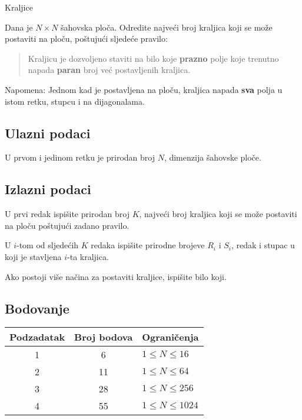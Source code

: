 \begin{statement}[
  problempoints=100,
  timelimit=1 sekunda,
  memorylimit=512 MiB,
]{Kraljice}

Dana je $N \times N$ šahovska ploča. Odredite najveći broj kraljica koji se može postaviti na ploču, poštujući sljedeće pravilo:
\begin{quote}
    Kraljicu je dozvoljeno staviti na bilo koje \textbf{prazno} polje koje trenutno napada \textbf{paran} broj već postavljenih kraljica.
\end{quote}

Napomena: Jednom kad je postavljena na ploču, kraljica napada \textbf{sva} polja u istom retku, stupcu i na dijagonalama.

\subsection*{Ulazni podaci}
U prvom i jedinom retku je prirodan broj $N$, dimenzija šahovske ploče.

\subsection*{Izlazni podaci}

U prvi redak ispišite prirodan broj $K$, najveći broj kraljica koji se može postaviti na ploču poštujući zadano pravilo.

U $i$-tom od sljedećih $K$ redaka ispišite prirodne brojeve $R_i$ i $S_i$, redak i stupac u koji je stavljena $i$-ta kraljica.

Ako postoji više načina za postaviti kraljice, ispišite bilo koji.

\subsection*{Bodovanje}
{\renewcommand{\arraystretch}{1.4}
  \setlength{\tabcolsep}{6pt}
  \begin{tabular}{ccl}
 Podzadatak & Broj bodova & Ograničenja \\ \midrule
  1 & 6 & $1 \le N \le 16$\\
  2 & 11 & $1 \le N \le 64$\\
  3 & 28 & $1 \le N \le 256$\\
  4 & 55 & $1 \le N \le 1024$\\
\end{tabular}}


\end{statement}

